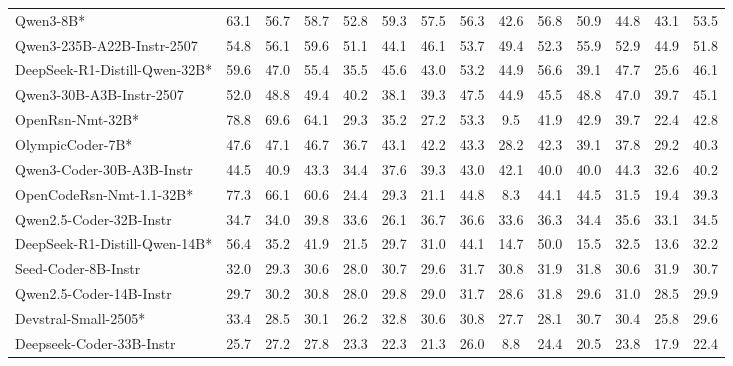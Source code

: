 \begin{table}[hbt]
{\begin{tabular}{l *{13}{c}}
Qwen3-8B*&	63.1&	56.7&	58.7&	52.8&	59.3&	57.5&	56.3&	42.6&	56.8&	50.9&	44.8&	43.1&	53.5\\												
\rowcolor{gray!10}
Qwen3-235B-A22B-Instr-2507&	54.8&	56.1&	59.6&	51.1&	44.1&	46.1&	53.7&	49.4&	52.3&	55.9&	52.9&	44.9&	51.8\\												
DeepSeek-R1-Distill-Qwen-32B*&	59.6&	47.0&	55.4&	35.5&	45.6&	43.0&	53.2&	44.9&	56.6&	39.1&	47.7&	25.6&	46.1\\												
\rowcolor{gray!10}
Qwen3-30B-A3B-Instr-2507&	52.0&	48.8&	49.4&	40.2&	38.1&	39.3&	47.5&	44.9&	45.5&	48.8&	47.0&	39.7&	45.1\\												
OpenRsn-Nmt-32B*&	78.8&	69.6&	64.1&	29.3&	35.2&	27.2&	53.3&	9.5&	41.9&	42.9&	39.7&	22.4&	42.8\\												
\rowcolor{gray!10}
OlympicCoder-7B*&	47.6&	47.1&	46.7&	36.7&	43.1&	42.2&	43.3&	28.2&	42.3&	39.1&	37.8&	29.2&	40.3\\												
Qwen3-Coder-30B-A3B-Instr&	44.5&	40.9&	43.3&	34.4&	37.6&	39.3&	43.0&	42.1&	40.0&	40.0&	44.3&	32.6&	40.2\\										
\rowcolor{gray!10}
OpenCodeRsn-Nmt-1.1-32B*&	77.3&	66.1&	60.6&	24.4&	29.3&	21.1&	44.8&	8.3&	44.1&	44.5&	31.5&	19.4&	39.3\\												
Qwen2.5-Coder-32B-Instr&	34.7&	34.0&	39.8&	33.6&	26.1&	36.7&	36.6&	33.6&	36.3&	34.4&	35.6&	33.1&	34.5\\											
\rowcolor{gray!10}
DeepSeek-R1-Distill-Qwen-14B*&	56.4&	35.2&	41.9&	21.5&	29.7&	31.0&	44.1&	14.7&	50.0&	15.5&	32.5&	13.6&	32.2\\												
Seed-Coder-8B-Instr&	32.0&	29.3&	30.6&	28.0&	30.7&	29.6&	31.7&	30.8&	31.9&	31.8&	30.6&	31.9&	30.7\\													
\rowcolor{gray!10}
Qwen2.5-Coder-14B-Instr&	29.7&	30.2&	30.8&	28.0&	29.8&	29.0&	31.7&	28.6&	31.8&	29.6&	31.0&	28.5&	29.9\\															
Devstral-Small-2505*&	33.4&	28.5&	30.1&	26.2&	32.8&	30.6&	30.8&	27.7&	28.1&	30.7&	30.4&	25.8&	29.6\\													
\rowcolor{gray!10}
Deepseek-Coder-33B-Instr&	25.7&	27.2&	27.8&	23.3&	22.3&	21.3&	26.0&	8.8&	24.4&	20.5&	23.8&	17.9&	22.4\\															


\bottomrule
\end{tabular}%
}
\end{table}
